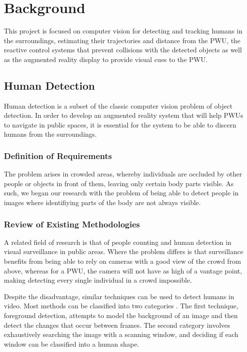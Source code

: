 \chapter{Background}
This project is focused on computer vision for detecting and tracking humans in the surroundings, estimating their trajectories and distance from the PWU, the reactive control systems that prevent collisions with the detected objects as well as the augmented reality display to provide visual cues to the PWU.

\section{Human Detection}
Human detection is a subset of the classic computer vision problem of object detection. In order to develop an augmented reality system that will help PWUs to navigate in public spaces, it is essential for the system to be able to discern humans from the surroundings.

\subsection{Definition of Requirements}
 The problem arises in crowded areas, whereby individuals are occluded by other people or objects in front of them, leaving only certain body parts visible. As such, we began our research with the problem of being able to detect people in images where identifiying parts of the body are not always visible.

\subsection{Review of Existing Methodologies}
A related field of research is that of people counting and human detection in visual surveillance in public areas. Where the problem differs is that surveillance benefits from being able to rely on cameras with a good view of the crowd from above, whereas for a PWU, the camera will not have as high of a vantage point, making detecting every single individual in a crowd impossible. 

Despite the disadvantage, similar techniques can be used to detect humans in video. Most methods can be classified into two categories \cite{Hou2010}. The first technique, foreground detection, attempts to model the background of an image and then detect the changes that occur between frames. The second category involves exhaustively searching the image with a scanning window, and deciding if each window can be classified into a human shape.

